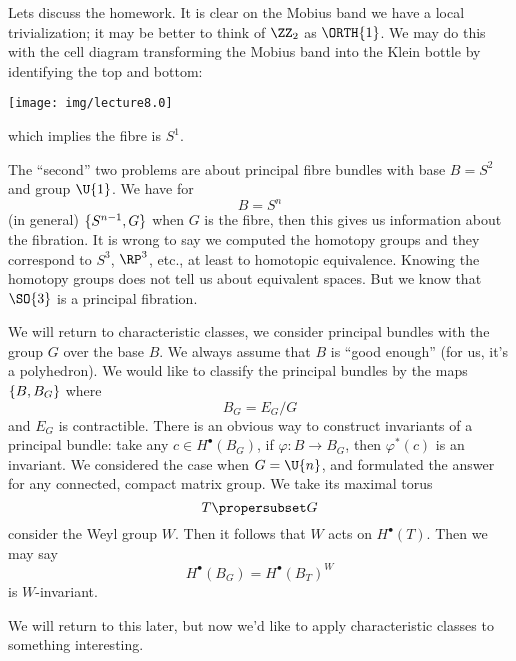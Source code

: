 Lets discuss the homework. It is clear on the Mobius band we have
a local trivialization; it may be better to think of $\ZZ_{2}$ as
$\ORTH{1}$. We may do this with the cell diagram transforming the
Mobius band into the Klein bottle by identifying the top and
bottom:
\begin{center}
\texttt{[image: img/lecture8.0]}
\end{center}
which implies the fibre is $S^{1}$.

The ``second'' two problems are about principal fibre bundles
with base $B=S^{2}$ and group $\U{1}$. We have for
\begin{equation}
B=S^{n}
\end{equation}
(in general) $\homotopyClass(S^{n-1},G)$ when $G$ is the fibre,
then this gives us information about the fibration. It is wrong
to say we computed the homotopy groups and they correspond to
$S^{3}$, $\RP^{3}$, etc., at least to homotopic
equivalence. Knowing the homotopy groups does not tell us about
equivalent spaces. But we know that $\SO{3}$ is a principal
fibration.

\bigskip

We will return to characteristic classes, we consider principal
bundles with the group $G$ over the base $B$. We always assume
that $B$ is ``good enough'' (for us, it's a polyhedron). We would
like to classify the principal bundles by the maps
$\homotopyClass(B,B_{G})$ where
\begin{equation}
B_{G}=E_{G}/G
\end{equation}
and $E_{G}$ is contractible. There is an obvious way to construct
invariants of a principal bundle: take any $c\in
H^{\bullet}(B_{G})$, if $\varphi\colon B\to B_{G}$, then
$\varphi^{*}(c)$ is an invariant. We considered the case when
$G=\U{n}$, and formulated the answer for any connected, compact
matrix group. We take its maximal torus
\begin{equation}
T\propersubset G
\end{equation}
consider the Weyl group $W$. Then it follows that $W$ acts on
$H^{\bullet}(T)$. Then we may say 
\begin{equation}
H^{\bullet}(B_{G})=H^{\bullet}(B_{T})^{W}
\end{equation}
is $W$-invariant.

We will return to this later, but now we'd like to apply
characteristic classes to something interesting.

